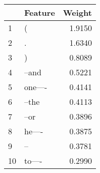 \begin{tabular}{llr}
\toprule
{} &  Feature &  Weight \\
\midrule
1  &        ( &  1.9150 \\
2  &        . &  1.6340 \\
3  &        ) &  0.8089 \\
4  &    --and &  0.5221 \\
5  &  one---- &  0.4141 \\
6  &    --the &  0.4113 \\
7  &     --or &  0.3896 \\
8  &   he---- &  0.3875 \\
9  &       -- &  0.3781 \\
10 &   to---- &  0.2990 \\
\bottomrule
\end{tabular}

